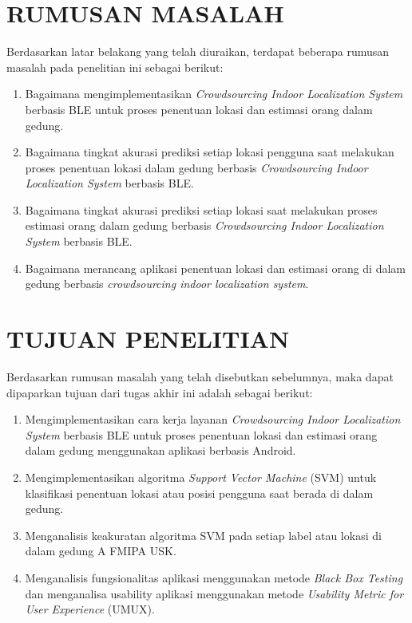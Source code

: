 \section{\uppercase{RUMUSAN MASALAH}}
Berdasarkan latar belakang yang telah diuraikan, terdapat beberapa rumusan masalah pada penelitian ini sebagai berikut:
\begin{enumerate}
	\item Bagaimana mengimplementasikan \textit{Crowdsourcing Indoor Localization System} berbasis BLE untuk proses penentuan lokasi dan estimasi orang dalam gedung.
	\item Bagaimana tingkat akurasi prediksi setiap lokasi pengguna saat melakukan proses  penentuan lokasi dalam gedung berbasis \textit{Crowdsourcing Indoor Localization System} berbasis BLE.
	\item Bagaimana tingkat akurasi prediksi setiap lokasi saat melakukan proses estimasi orang dalam gedung berbasis \textit{Crowdsourcing Indoor Localization System} berbasis BLE.
	\item Bagaimana merancang aplikasi penentuan lokasi dan estimasi orang di dalam gedung berbasis \textit{crowdsourcing indoor localization system}.

\end{enumerate}

\section{\uppercase{TUJUAN PENELITIAN}}
Berdasarkan rumusan masalah yang telah disebutkan sebelumnya, maka dapat dipaparkan tujuan dari tugas akhir ini adalah sebagai berikut:
\begin{enumerate}
	\item Mengimplementasikan cara kerja layanan \textit{Crowdsourcing Indoor Localization System} berbasis BLE untuk proses penentuan lokasi dan estimasi orang dalam gedung menggunakan aplikasi berbasis Android.
	\item Mengimplementasikan algoritma \textit{\textit{Support Vector Machine}} (SVM) untuk klasifikasi penentuan lokasi atau posisi pengguna saat berada  di dalam gedung.
	\item Menganalisis keakuratan algoritma SVM pada setiap label atau lokasi di dalam gedung A FMIPA USK.
	\item Menganalisis fungsionalitas aplikasi menggunakan metode \textit{Black Box Testing} dan menganalisa usability aplikasi menggunakan metode \textit{Usability Metric for User Experience} (UMUX).
\end{enumerate}


